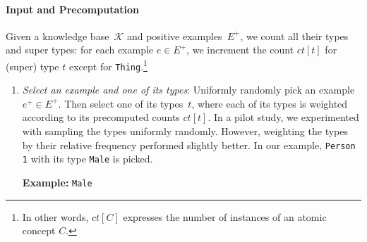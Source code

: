 

\paragraph{Input and Precomputation}
Given a knowledge base~$\mathcal{K}$ and positive examples~$E^+$, we count all their types and super types: for each example $e \in E^+$, we increment the count $\mathit{ct}[t]$ for (super) type $t$ except for \texttt{Thing}.\footnote{In other words, $\mathit{ct}[C]$ expresses the number of instances of an atomic concept $C$.}

\begin{enumerate}
		\item\label{item1-rw} \textit{Select an example and one of its types}: Uniformly randomly pick an example \mbox{$e^{+} \in E^{+}$}. Then select one of its types~$t$, where each of its types is weighted according to its precomputed counts $\mathit{ct}[t]$. In a pilot study, we experimented with sampling the types uniformly randomly. However, weighting the types by their relative frequency performed slightly better. In our example, \texttt{Person 1} with its type \texttt{Male} is picked.
		
		\medskip
		\textbf{Example:} \texttt{Male}
		\medskip


\end{enumerate}
